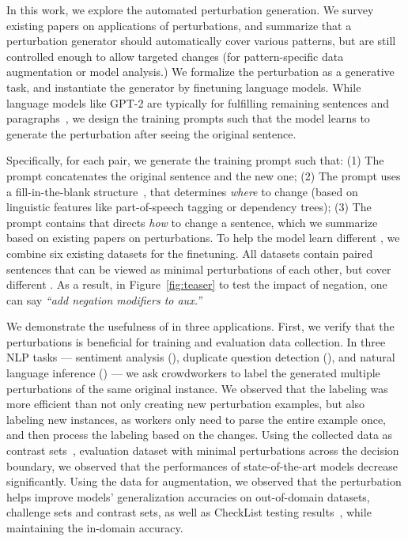In this work, we explore the automated perturbation generation.
We survey existing papers on applications of perturbations, and summarize that a perturbation generator should automatically cover various patterns, but are still controlled enough to allow targeted changes (for pattern-specific data augmentation or model analysis.)
We formalize the perturbation as a generative task, and instantiate the generator by finetuning language models.
While language models like GPT-2 are typically for fulfilling remaining sentences and paragraphs~\cite{radford2019language}, we design the training prompts such that the model learns to generate the perturbation after seeing the original sentence.

Specifically, for each pair, we generate the training prompt such that:
(1) The prompt concatenates the original sentence and the new one;  
(2) The prompt uses a fill-in-the-blank structure~\cite{donahue2020enabling}, that determines \emph{where} to change (based on linguistic features like part-of-speech tagging or dependency trees);
(3) The prompt contains \tagstrs that directs \emph{how} to change a sentence, which we summarize based on existing papers on perturbations.
To help the model learn different \tagstrs, we combine six existing datasets for the finetuning.
All datasets contain paired sentences that can be viewed as minimal perturbations of each other, but cover different \tagstrs.
As a result, in Figure~\ref{fig:teaser} to test the impact of negation, one can say \emph{``add negation modifiers to aux.''}



We demonstrate the usefulness of \sysname in three applications. 
First, we verify that the perturbations is beneficial for training and evaluation data collection. 
In three NLP tasks --- sentiment analysis (\sst), duplicate question detection (\qqp), and natural language inference (\nli) --- we ask crowdworkers to label the generated multiple perturbations of the same original instance.
We observed that the labeling was more efficient than not only creating new perturbation examples, but also labeling new instances, as workers only need to parse the entire example once, and then process the labeling based on the changes.
Using the collected data as contrast sets~\cite{gardner2020contrast}, \ie evaluation dataset with minimal perturbations across the decision boundary, we observed that the performances of state-of-the-art models decrease significantly. 
Using the data for augmentation, we observed that the perturbation helps improve models' generalization accuracies on out-of-domain datasets, challenge sets and contrast sets, as well as CheckList testing results~\cite{checklist:acl20}, while maintaining the in-domain accuracy.


